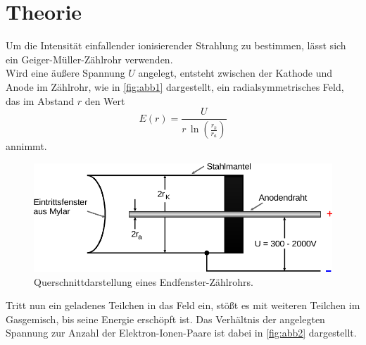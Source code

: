 \section{Theorie}
\label{sec:theorie}

Um die Intensität einfallender ionisierender Strahlung zu bestimmen, lässt sich ein Geiger-Müller-Zählrohr verwenden. \\

Wird eine äußere Spannung $U$ angelegt, entsteht zwischen der Kathode und Anode im Zählrohr, wie in \autoref{fig:abb1} dargestellt,
ein radialsymmetrisches Feld, das im Abstand $r$ den Wert
\begin{equation}
    E(r) = \frac{U}{r \,\ln \left(\frac{r_k}{r_a} \right)}
\end{equation}
annimmt.

\begin{figure}[H]
    \centering
    \includegraphics{figures/Abb_1.pdf}
    \caption{Querschnittdarstellung eines
    Endfenster-Zählrohrs\cite{ap03}.}
    \label{fig:abb1}
\end{figure}

Tritt nun ein geladenes Teilchen in das 
Feld ein, stößt es mit weiteren Teilchen
im Gasgemisch, bis seine Energie erschöpft ist.
Das Verhältnis der angelegten Spannung zur
Anzahl der Elektron-Ionen-Paare ist dabei in
\autoref{fig:abb2} dargestellt.

